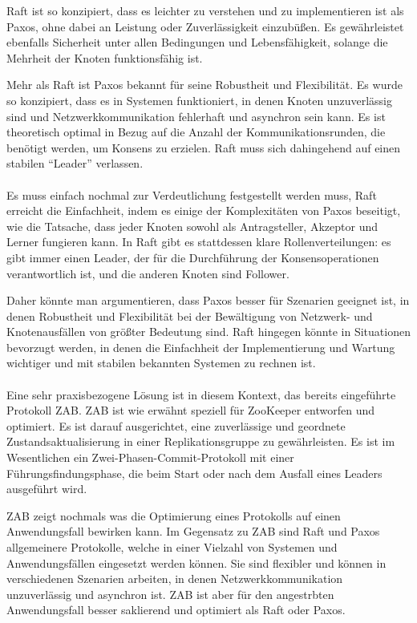 Raft ist so konzipiert, dass es leichter zu verstehen und zu implementieren ist als Paxos, ohne dabei an Leistung oder Zuverlässigkeit einzubüßen. Es gewährleistet ebenfalls Sicherheit unter allen Bedingungen und Lebensfähigkeit, solange die Mehrheit der Knoten funktionsfähig ist.

Mehr als Raft ist Paxos bekannt für seine Robustheit und Flexibilität. Es wurde so konzipiert, dass es in Systemen funktioniert, in denen Knoten unzuverlässig sind und Netzwerkkommunikation fehlerhaft und asynchron sein kann. Es ist theoretisch optimal in Bezug auf die Anzahl der Kommunikationsrunden, die benötigt werden, um Konsens zu erzielen. Raft muss sich dahingehend auf einen stabilen \enquote{Leader} verlassen. 
\\\\
Es muss einfach nochmal zur Verdeutlichung festgestellt werden muss, Raft erreicht die Einfachheit, indem es einige der Komplexitäten von Paxos beseitigt, wie die Tatsache, dass jeder Knoten sowohl als Antragsteller, Akzeptor und Lerner fungieren kann. In Raft gibt es stattdessen klare Rollenverteilungen: es gibt immer einen Leader, der für die Durchführung der Konsensoperationen verantwortlich ist, und die anderen Knoten sind Follower.

Daher könnte man argumentieren, dass Paxos besser für Szenarien geeignet ist, in denen Robustheit und Flexibilität bei der Bewältigung von Netzwerk- und Knotenausfällen von größter Bedeutung sind. Raft hingegen könnte in Situationen bevorzugt werden, in denen die Einfachheit der Implementierung und Wartung wichtiger und mit stabilen bekannten Systemen zu rechnen ist.
\\\\
Eine sehr praxisbezogene Lösung ist in diesem Kontext, das bereits eingeführte Protokoll ZAB. ZAB ist wie erwähnt speziell für ZooKeeper entworfen und optimiert. Es ist darauf ausgerichtet, eine zuverlässige und geordnete Zustandsaktualisierung in einer Replikationsgruppe zu gewährleisten. Es ist im Wesentlichen ein Zwei-Phasen-Commit-Protokoll mit einer Führungsfindungsphase, die beim Start oder nach dem Ausfall eines Leaders ausgeführt wird.

ZAB zeigt nochmals was die Optimierung eines Protokolls auf einen Anwendungsfall bewirken kann. Im Gegensatz zu ZAB sind Raft und Paxos allgemeinere Protokolle, welche in einer Vielzahl von Systemen und Anwendungsfällen eingesetzt werden können. Sie sind flexibler und können in verschiedenen Szenarien arbeiten, in denen Netzwerkkommunikation unzuverlässig und asynchron ist. ZAB ist aber für den angestrbten Anwendungsfall besser saklierend und optimiert als Raft oder Paxos.

